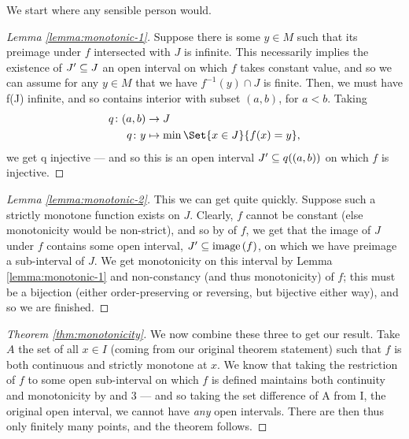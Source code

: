 We start where any sensible person would.

\begin{proof}[Lemma \ref{lemma:monotonic-1}]
  Suppose there is some $y \in M$ such that its preimage under $f$ intersected with $J$ is infinite. This necessarily implies the existence of $ J^{\prime} \subseteq J$ an open interval on which $f$ takes constant value, and so we can assume for any $y \in M$ that we have $f^{-1}(y) \cap J$ is finite. Then, we must have f(J) infinite, and so contains interior with subset $ (a, b) $, for $a < b$. Taking
  \begin{align*}
    q \colon (a, b) &\to J \\
    q \colon y &\mapsto \min{\Set{x \in J}{f(x) = y}},
  \end{align*}
  we get q injective — and so this is an open interval $ J^{\prime} \subseteq q((a, b))$ on which $f$ is injective.
\end{proof}


\begin{proof}[Lemma \ref{lemma:monotonic-2}]
  This we can get quite quickly. Suppose such a strictly monotone function exists on $J$. Clearly, $f$ cannot be constant (else monotonicity would be non-strict), and so by \omy of $f$, we get that the image of $J$ under $f$ contains some open interval, $ J^{\prime} \subseteq \operatorname{image}\left(f\right)$, on which we have preimage a sub-interval of $J$. We get monotonicity on this interval by Lemma \ref{lemma:monotonic-1} and non-constancy (and thus monotonicity) of $f$; this must be a bijection (either order-preserving or reversing, but bijective either way), and so we are finished.
\end{proof}



\begin{proof}[Theorem \ref{thm:monotonicity}]
  We now combine these three \lemmas to get our result. Take $A$ the set of all $x \in I$ (coming from our original theorem statement) such that $f$ is both continuous and strictly monotone at $x$. We know that taking the restriction of $f$ to some open sub-interval on which $f$ is defined maintains both continuity and monotonicity by  and 3 — and so taking the set difference of A from I, the original open interval, we cannot have \emph{any} open intervals. There are then thus only finitely many points, and the theorem follows.
\end{proof}

